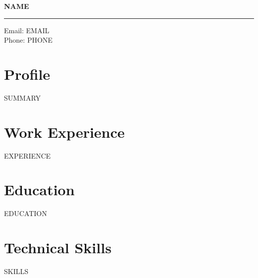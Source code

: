 \documentclass[11pt]{article}
\begin{document}
\begin{center}
{\LARGE \textbf{{{NAME}}}}
\end{center}

\hrule

\vspace{0.2cm}

Email: {{EMAIL}}\\
Phone: {{PHONE}}

\section*{Profile}
{{SUMMARY}}

\section*{Work Experience}
{{EXPERIENCE}}

\section*{Education}
{{EDUCATION}}

\section*{Technical Skills}
{{SKILLS}}
\end{document}
